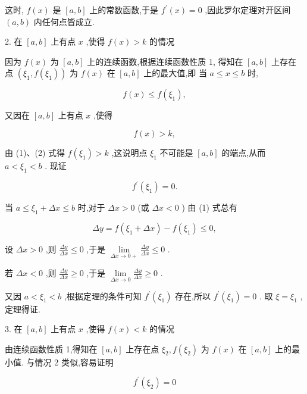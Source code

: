 \documentclass[lang=cn,newtx,12pt,scheme=chinese]{elegantbook}
\begin{document}
这时, \(f\left( x\right)\) 是 \(\left\lbrack {a,b}\right\rbrack\) 上的常数函数,于是 \({f}^{\prime }\left( x\right) = 0\) ,因此罗尔定理对开区间 \(\left( {a,b}\right)\) 内任何点皆成立.

2. 在 \(\left\lbrack {a,b}\right\rbrack\) 上有点 \(x\) ,使得 \(f\left( x\right) > k\) 的情况

因为 \(f\left( x\right)\) 为 \(\left\lbrack {a,b}\right\rbrack\) 上的连续函数,根据连续函数性质 1, 得知在 \(\left\lbrack {a,b}\right\rbrack\) 上存在点 \(\left( {{\xi }_{1},f\left( {\xi }_{1}\right) }\right)\) 为 \(f\left( x\right)\) 在 \(\left\lbrack {a,b}\right\rbrack\) 上的最大值,即 当 \(a \leq x \leq b\) 时,

\[
f\left( x\right) \leq f\left( {\xi }_{1}\right) , \tag{1}
\]

又因在 \(\left\lbrack {a,b}\right\rbrack\) 上有点 \(x\) ,使得

\[
f\left( x\right) > k, \tag{2}
\]

由 (1)、(2) 式得 \(f\left( {\xi }_{1}\right) > k\) ,这说明点 \({\xi }_{1}\) 不可能是 \(\left\lbrack {a,b}\right\rbrack\) 的端点,从而 \(a < {\xi }_{1} < b\) . 现证

\[
{f}^{\prime }\left( {\xi }_{1}\right) = 0\text{.}
\]

当 \(a \leq {\xi }_{1} + {\Delta x} \leq b\) 时,对于 \({\Delta x} > 0\) (或 \({\Delta x} < 0\) ) 由 (1) 式总有

\[
{\Delta y} = f\left( {{\xi }_{1} + {\Delta x}}\right) - f\left( {\xi }_{1}\right) \leq 0,
\]

设 \({\Delta x} > 0\) ,则 \(\frac{\Delta y}{\Delta x} \leq 0\) ,于是 \(\mathop{\lim }\limits_{{{\Delta x} \rightarrow 0 + }}\frac{\Delta y}{\Delta x} \leq 0\) .

若 \({\Delta x} < 0\) ,则 \(\frac{\Delta y}{\Delta x} \geq 0\) ,于是 \(\mathop{\lim }\limits_{{{\Delta x} \rightarrow 0}}\frac{\Delta y}{\Delta x} \geq 0\) .

又因 \(a < {\xi }_{1} < b\) ,根据定理的条件可知 \({f}^{\prime }\left( {\xi }_{1}\right)\) 存在,所以 \({f}^{\prime }\left( {\xi }_{1}\right) = 0\) . 取 \(\xi = {\xi }_{1}\) ,定理得证.

3. 在 \(\left\lbrack {a,b}\right\rbrack\) 上有点 \(x\) ,使得 \(f\left( x\right) < k\) 的情况

由连续函数性质 1,得知在 \(\left\lbrack {a,b}\right\rbrack\) 上存在点 \({\xi }_{2},f\left( {\xi }_{2}\right)\) 为 \(f\left( x\right)\) 在 \(\left\lbrack {a,b}\right\rbrack\) 上的最小值. 与情况 2 类似,容易证明

\[
{f}^{\prime }\left( {\xi }_{2}\right) = 0
\]
\end{document}
